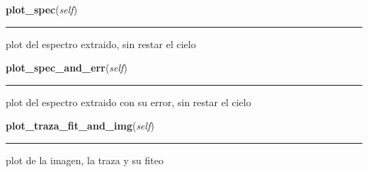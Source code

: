     \label{spectro_metria_g:spect:plot_spec}

    \vspace{0.5ex}

\hspace{.8\funcindent}\begin{boxedminipage}{\funcwidth}

    \raggedright \textbf{plot\_spec}(\textit{self})

    \vspace{-1.5ex}

    \rule{\textwidth}{0.5\fboxrule}
\setlength{\parskip}{2ex}
    plot del espectro extraido, sin restar el cielo

\setlength{\parskip}{1ex}
    \end{boxedminipage}

    \label{spectro_metria_g:spect:plot_spec_and_err}

    \vspace{0.5ex}

\hspace{.8\funcindent}\begin{boxedminipage}{\funcwidth}

    \raggedright \textbf{plot\_spec\_and\_err}(\textit{self})

    \vspace{-1.5ex}

    \rule{\textwidth}{0.5\fboxrule}
\setlength{\parskip}{2ex}
    plot del espectro extraido con su error, sin restar el cielo

\setlength{\parskip}{1ex}
    \end{boxedminipage}

    \label{spectro_metria_g:spect:plot_traza_fit_and_img}

    \vspace{0.5ex}

\hspace{.8\funcindent}\begin{boxedminipage}{\funcwidth}

    \raggedright \textbf{plot\_traza\_fit\_and\_img}(\textit{self})

    \vspace{-1.5ex}

    \rule{\textwidth}{0.5\fboxrule}
\setlength{\parskip}{2ex}
    plot de la imagen, la traza y su fiteo

\setlength{\parskip}{1ex}
    \end{boxedminipage}

